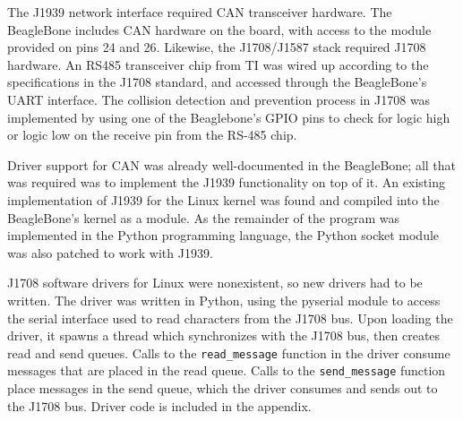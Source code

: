 The J1939 network interface required CAN transceiver hardware. The BeagleBone includes CAN hardware on the board, with access
to the module provided on pins 24 and 26. Likewise, the J1708/J1587 stack required J1708 hardware. An RS485 transceiver chip from TI
was wired up according to the specifications in the J1708 standard, and accessed through the BeagleBone's UART interface.
The collision detection and prevention process in J1708 was implemented by using one of the Beaglebone's GPIO pins
to check for logic high or logic low on the receive pin from the RS-485 chip.


Driver support for CAN was already well-documented in the BeagleBone; all that was required was to implement the J1939
functionality on top of it. An existing implementation of J1939 for the Linux kernel was found \cite{j1939linux} and compiled into
the BeagleBone's kernel as a module. As the remainder of the program was implemented in the Python programming language,
the Python socket module was also patched to work with J1939.

J1708 software drivers for Linux were nonexistent, so new drivers had to be written. The driver was written in Python, using the pyserial
module to access the serial interface used to read characters from the J1708 bus. Upon loading the driver, it spawns a thread which synchronizes
with the J1708 bus, then creates read and send queues. Calls to the \texttt{read\_message} function in the driver consume messages that are placed in the
read queue. Calls to the \texttt{send\_message} function place messages in the send queue, which the driver consumes and sends out to the J1708 bus.
Driver code is included in the appendix.

